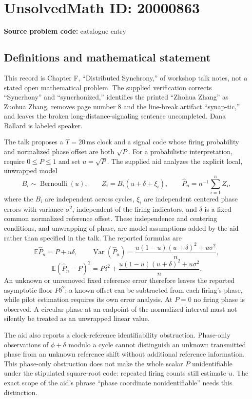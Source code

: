 \documentclass[11pt]{article}
\newcommand{\E}{\mathbb{E}}
\begin{document}
\section*{UnsolvedMath ID: 20000863}
\textbf{Source problem code:} catalogue entry
\subsection{Definitions and mathematical statement}
This record is Chapter F, ``Distributed Synchrony,'' of workshop talk notes, not a stated open mathematical problem. The supplied verification corrects ``Syncrhony'' and ``syncrhonized,'' identifies the printed ``Zhohua Zhang'' as Zuohua Zhang, removes page number 8 and the line-break artifact ``synap-tic,'' and leaves the broken long-distance-signaling sentence uncompleted. Dana Ballard is labeled speaker.

The talk proposes a \(T=20\,\mathrm{ms}\) clock and a signal code whose firing probability and normalized phase offset are both \(\sqrt P\). For a probabilistic interpretation, require \(0\le P\le1\) and set \(u=\sqrt P\). The supplied aid analyzes the explicit local, unwrapped model
\[
 B_i\sim\operatorname{Bernoulli}(u),\qquad
 Z_i=B_i(u+\delta+\xi_i),\qquad
 \widehat P_n=n^{-1}\sum_{i=1}^n Z_i,
\]
where the \(B_i\) are independent across cycles, \(\xi_i\) are independent centered phase errors with variance \(\sigma^2\), independent of the firing indicators, and \(\delta\) is a fixed common normalized reference offset. These independence and centering conditions, and unwrapping of phase, are model assumptions added by the aid rather than specified in the talk. The reported formulas are
\[
 \E\widehat P_n=P+u\delta,\qquad
 \operatorname{Var}(\widehat P_n)
 =\frac{u(1-u)(u+\delta)^2+u\sigma^2}{n},
\]
\[
 \E(\widehat P_n-P)^2
 =P\delta^2+\frac{u(1-u)(u+\delta)^2+u\sigma^2}{n}.
\]
An unknown or unremoved fixed reference error therefore leaves the reported asymptotic floor \(P\delta^2\); a known offset can be subtracted from each firing's phase, while pilot estimation requires its own error analysis. At \(P=0\) no firing phase is observed. A circular phase at an endpoint of the normalized interval must not silently be treated as an unwrapped linear value.

The aid also reports a clock-reference identifiability obstruction. Phase-only observations of \(\phi+\delta\) modulo a cycle cannot distinguish an unknown transmitted phase from an unknown reference shift without additional reference information. This phase-only obstruction does not make the whole scalar \(P\) unidentifiable under the stipulated square-root code: repeated firing counts still estimate \(u\). The exact scope of the aid's phrase ``phase coordinate nonidentifiable'' needs this distinction.
\end{document}
